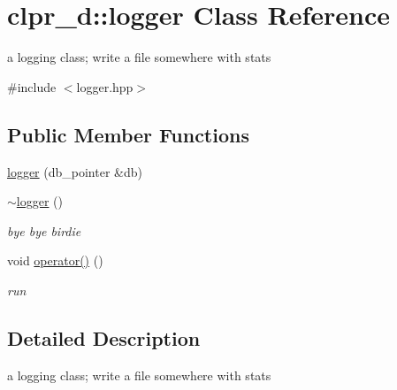 \hypertarget{classclpr__d_1_1logger}{\section{clpr\-\_\-d\-:\-:logger \-Class \-Reference}
\label{classclpr__d_1_1logger}
}


a logging class; write a file somewhere with stats  




{\ttfamily \#include $<$logger.\-hpp$>$}

\subsection*{\-Public \-Member \-Functions}
\begin{DoxyCompactItemize}
\item 
\hyperlink{classclpr__d_1_1logger_a5c3e9d287ef0079541813437e7c63397}{logger} (db\-\_\-pointer \&db)
\item 
\hypertarget{classclpr__d_1_1logger_af3d03543c1b8c77032e4e0ac8e8d3271}{\hyperlink{classclpr__d_1_1logger_af3d03543c1b8c77032e4e0ac8e8d3271}{$\sim$logger} ()}\label{classclpr__d_1_1logger_af3d03543c1b8c77032e4e0ac8e8d3271}

\begin{DoxyCompactList}\small\item\em bye bye birdie \end{DoxyCompactList}\item 
\hypertarget{classclpr__d_1_1logger_a7dbb1420b0bb6b6c9c8919de52424342}{void \hyperlink{classclpr__d_1_1logger_a7dbb1420b0bb6b6c9c8919de52424342}{operator()} ()}\label{classclpr__d_1_1logger_a7dbb1420b0bb6b6c9c8919de52424342}

\begin{DoxyCompactList}\small\item\em run \end{DoxyCompactList}\end{DoxyCompactItemize}


\subsection{\-Detailed \-Description}
a logging class; write a file somewhere with stats 

